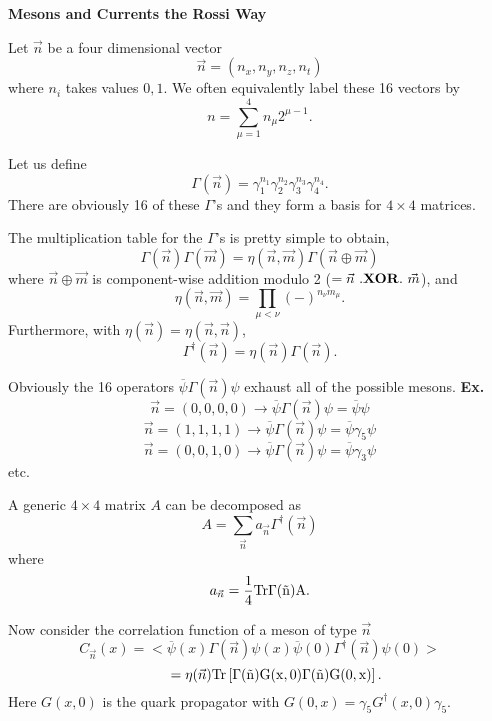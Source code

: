 
\oneandahalfspace
\def\Tr{\rm Tr}
\def\trd{\rm tr_d}
\def\trc{\rm tr_c}
\def\Re{\rm Re}

\centerline{\bf Mesons and Currents the Rossi Way}
\bigskip

\medskip

Let $\vec n$ be a four dimensional vector
$$ \vec n = (n_x, n_y, n_z, n_t) $$
where $n_i $ takes values $0, 1.$ We often equivalently label these 16
vectors by 
$$ n = \sum_{\mu = 1}^4 n_{\mu} 2^{\mu-1}. $$

Let us define 
$$\Gamma(\vec n) = \gamma_1^{n_1}\gamma_2^{n_2}\gamma_3^{n_3}\gamma_4^{n_4}.$$
There are obviously 16 of these $\Gamma$'s and they form a basis for
$ 4 \times 4 $ matrices.

The multiplication table for the $\Gamma$'s is pretty simple to obtain,
$$ \Gamma(\vec n)\Gamma(\vec m) = 
   \eta(\vec n,\vec m)\Gamma(\vec n \oplus \vec m)$$
where $\vec n \oplus \vec m$ is component-wise addition modulo 2 ($ = \vec n 
~.{\bf XOR}.~ \vec m$), and 
$$ \eta(\vec n, \vec m) = \prod_{\mu < \nu}(-)^{n_\nu m_\mu}. $$
Furthermore, with $\eta(\vec n) = \eta(\vec n,\vec n)$,
$$ \Gamma^\dagger(\vec n) = \eta(\vec n) \Gamma(\vec n). $$

Obviously the 16 operators $\overline \psi \Gamma(\vec n)\psi $
exhaust all of the possible mesons.
\smallskip
{\bf Ex.}
$$\vec n = (0, 0, 0, 0) \to 
 \overline \psi \Gamma(\vec n) \psi = \overline \psi \psi$$
$$\vec n = (1, 1, 1, 1) \to 
 \overline \psi \Gamma(\vec n) \psi = \overline \psi \gamma_5 \psi$$
$$\vec n = (0, 0, 1, 0) \to 
 \overline \psi \Gamma(\vec n) \psi = \overline \psi \gamma_3 \psi$$
etc.

A generic $4 \times 4$ matrix $A$ can be decomposed as
$$ A = \sum_{\vec n} a_{\vec n}\Gamma^\dagger(\vec n) $$
where 
$$ a_{\vec n} = {1 \over 4} \Tr \Gamma(\vec n)A. $$

Now consider the correlation function of a meson of type $\vec n$
$$ C_{\vec n} (x) = < \overline \psi(x) \Gamma(\vec n) \psi(x)
 \overline \psi(0) \Gamma^\dagger(\vec n) \psi(0)> $$
$$ ~~~~~~~ =\eta(\vec n) \Tr \left[ \Gamma(\vec n) G(x,0) 
 \Gamma(\vec n) G(0,x) \right]. $$
Here $G(x,0)$ is the quark propagator with $G(0,x) = \gamma_5 
G^\dagger (x,0) \gamma_5$.

